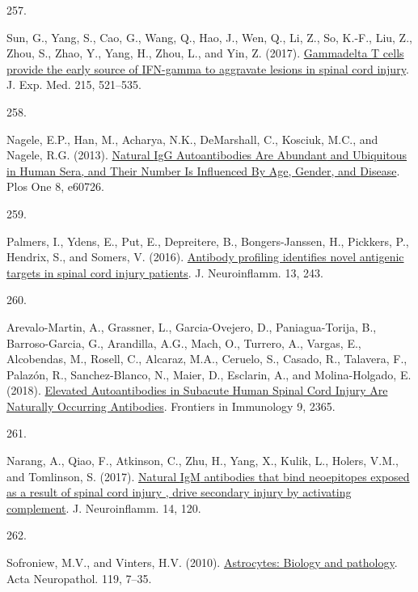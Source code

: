 \documentclass[
]{article}
\newlength{\cslhangindent}
\newlength{\csllabelwidth}
\newlength{\cslentryspacingunit} %
\newenvironment{CSLReferences}[2] %
 {%
  \setlength{\parindent}{0pt}
  \ifodd #1
  \let\oldpar\par
  \def\par{\hangindent=\cslhangindent\oldpar}
  \fi
  \setlength{\parskip}{#2\cslentryspacingunit}
 }%
 {}
\newcommand{\CSLLeftMargin}[1]{\parbox[t]{\csllabelwidth}{#1}}
\newcommand{\CSLRightInline}[1]{\parbox[t]{\linewidth - \csllabelwidth}{#1}\break}
\begin{document}
\begin{CSLReferences}{0}{0}
\leavevmode{}%
\CSLLeftMargin{257. }
\CSLRightInline{Sun, G., Yang, S., Cao, G., Wang, Q., Hao, J., Wen, Q., Li, Z., So, K.-F., Liu, Z., Zhou, S., Zhao, Y., Yang, H., Zhou, L., and Yin, Z. (2017). \href{https://doi.org/10.1084/jem.20170686}{Gammadelta {T} cells provide the early source of {IFN-gamma} to aggravate lesions in spinal cord injury}. J. Exp. Med. 215, 521--535.}

\leavevmode{}%
\CSLLeftMargin{258. }
\CSLRightInline{Nagele, E.P., Han, M., Acharya, N.K., DeMarshall, C., Kosciuk, M.C., and Nagele, R.G. (2013). \href{https://doi.org/10.1371/journal.pone.0060726}{Natural {IgG Autoantibodies Are Abundant} and {Ubiquitous} in {Human Sera}, and {Their Number Is Influenced By Age}, {Gender}, and {Disease}}. Plos One 8, e60726.}

\leavevmode{}%
\CSLLeftMargin{259. }
\CSLRightInline{Palmers, I., Ydens, E., Put, E., Depreitere, B., Bongers-Janssen, H., Pickkers, P., Hendrix, S., and Somers, V. (2016). \href{https://doi.org/10.1186/s12974-016-0713-5}{Antibody profiling identifies novel antigenic targets in spinal cord injury patients}. J. Neuroinflamm. 13, 243.}

\leavevmode{}%
\CSLLeftMargin{260. }
\CSLRightInline{Arevalo-Martin, A., Grassner, L., Garcia-Ovejero, D., Paniagua-Torija, B., Barroso-Garcia, G., Arandilla, A.G., Mach, O., Turrero, A., Vargas, E., Alcobendas, M., Rosell, C., Alcaraz, M.A., Ceruelo, S., Casado, R., Talavera, F., Palazón, R., Sanchez-Blanco, N., Maier, D., Esclarin, A., and Molina-Holgado, E. (2018). \href{https://doi.org/10.3389/fimmu.2018.02365}{Elevated {Autoantibodies} in {Subacute Human Spinal Cord Injury Are Naturally Occurring Antibodies}}. Frontiers in Immunology 9, 2365.}

\leavevmode{}%
\CSLLeftMargin{261. }
\CSLRightInline{Narang, A., Qiao, F., Atkinson, C., Zhu, H., Yang, X., Kulik, L., Holers, V.M., and Tomlinson, S. (2017). \href{https://doi.org/10.1186/s12974-017-0894-6}{Natural {IgM} antibodies that bind neoepitopes exposed as a result of spinal cord injury , drive secondary injury by activating complement}. J. Neuroinflamm. 14, 120.}

\leavevmode{}%
\CSLLeftMargin{262. }
\CSLRightInline{Sofroniew, M.V., and Vinters, H.V. (2010). \href{https://doi.org/10.1007/s00401-009-0619-8}{Astrocytes: Biology and pathology}. Acta Neuropathol. 119, 7--35.}


\end{CSLReferences}
\end{document}
